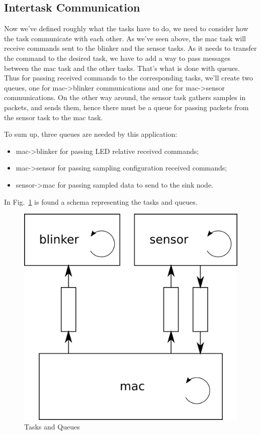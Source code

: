 \documentclass[11pt]{report}
\begin{document}
\subsection{Intertask Communication}
Now we've defined roughly what the tasks have to do, we need to consider how the task communicate with each other. As we've seen above, the mac task will receive commands sent to the blinker and the sensor tasks. As it needs to transfer the command to the desired task, we have to add a way to pass messages between the mac task and the other tasks. That's what is done with queues.
Thus for passing received commands to the corresponding tasks, we'll create two queues, one for mac->blinker communications and one for mac->sensor communications. On the other way around, the sensor task gathers samples in packets, and sends them, hence there must be a queue for passing packets from the sensor task to the mac task.

To sum up, three queues are needed by this application:
\begin{itemize}
	\item mac-\textgreater blinker for passing LED relative received commands;
	\item mac-\textgreater sensor for passing sampling configuration received commands;
	\item sensor-\textgreater mac for passing sampled data to send to the sink node.
\end{itemize}

In Fig.~\ref{fig:queues} is found a schema representing the tasks and queues.

\begin{figure}[ht]
	\begin{center}
	\includegraphics[scale=.8]{figures/queues.png}
	\end{center}
	\caption{Tasks and Queues}
	\label{fig:queues}
\end{figure}
\end{document}
